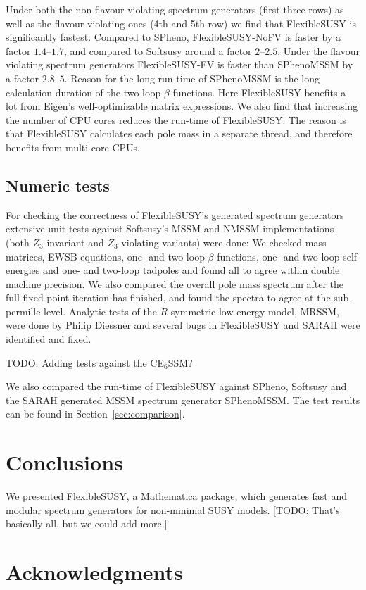 \documentclass[final,3p,11pt,pdflatex]{elsarticle}
\makeatletter
\newcommand{\fs}{FlexibleSUSY\@\xspace}
\newcommand{\secref}[1]{Section~\ref{#1}}
\makeatother
\begin{document}
Under both the non-flavour violating spectrum generators (first three
rows) as well as the flavour violating ones (4th and 5th row) we find
that \fs is significantly fastest.  Compared to SPheno,
FlexibleSUSY-NoFV is faster by a factor $1.4$--$1.7$, and compared to
Softsusy around a factor $2$--$2.5$.  Under the flavour violating
spectrum generators FlexibleSUSY-FV is faster than SPhenoMSSM by a
factor $2.8$--$5$.  Reason for the long run-time of SPhenoMSSM is the
long calculation duration of the two-loop $\beta$-functions.  Here \fs
benefits a lot from Eigen's well-optimizable matrix expressions.  We
also find that increasing the number of CPU cores reduces the run-time
of \fs.  The reason is that \fs calculates each pole mass in a
separate thread, and therefore benefits from multi-core CPUs.

\subsection{Numeric tests}

For checking the correctness of \fs's generated spectrum generators
extensive unit tests against Softsusy's MSSM and NMSSM
implementations (both $Z_3$-invariant and $Z_3$-violating variants)
were done: We checked mass matrices, EWSB equations, one- and two-loop
$\beta$-functions, one- and two-loop self-energies and one- and
two-loop tadpoles and found all to agree within double machine
precision.  We also compared the overall pole mass spectrum after the
full fixed-point iteration has finished, and found the spectra to
agree at the sub-permille level.  Analytic tests of the $R$-symmetric
low-energy model, MRSSM, were done by Philip Diessner and several bugs
in \fs and SARAH were identified and fixed.

TODO: Adding tests against the CE$_6$SSM?

We also compared the run-time of \fs against SPheno, Softsusy and the
SARAH generated MSSM spectrum generator SPhenoMSSM.  The test results
can be found in \secref{sec:comparison}.

\section{Conclusions}

We presented \fs, a Mathematica package, which generates fast and
modular spectrum generators for non-minimal SUSY models.  [TODO:
That's basically all, but we could add more.]

\section*{Acknowledgments}
\end{document}
